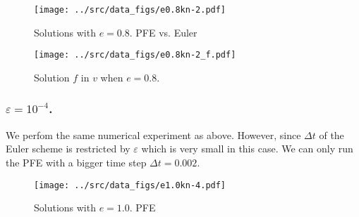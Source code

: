 \documentclass[reqno]{amsart}
\begin{document}
\begin{figure}
  \centering
  \texttt{[image: ../src/data\_figs/e0.8kn-2.pdf]}
  \caption{Solutions with $e=0.8$. PFE vs. Euler}
\end{figure}

\begin{figure}
\centering
\texttt{[image: ../src/data\_figs/e0.8kn-2\_f.pdf]}
\caption{Solution $f$ in $v$ when $e=0.8$.}
\end{figure}

\subsubsection{$\varepsilon=10^{-4}$.}

We perfom the same numerical experiment as above. However, since $\Delta t$ of the Euler scheme is restricted by $\varepsilon$ which is very small in this case. We can only run the PFE with a bigger time step $\Delta t = 0.002$.
\begin{figure}
\centering
\texttt{[image: ../src/data\_figs/e1.0kn-4.pdf]}
\caption{Solutions with $e=1.0$. PFE}
\end{figure}




{}

\end{document}
